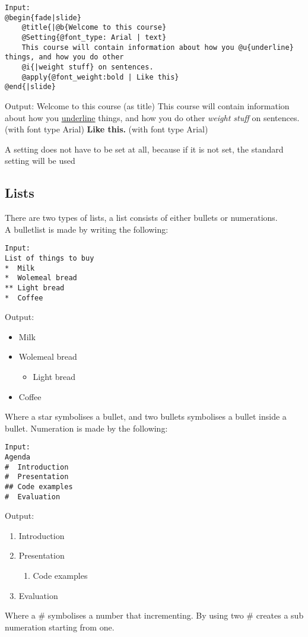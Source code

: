 \begin{verbatim}
Input:
@begin{fade|slide}
    @title{|@b{Welcome to this course}
    @Setting{@font_type: Arial | text}
    This course will contain information about how you @u{underline} things, and how you do other    
    @i{|weight stuff} on sentences.
    @apply{@font_weight:bold | Like this}
@end{|slide}
\end{verbatim}
Output:
Welcome to this course (as title)
This course will contain information about how you \underline{underline} things, and how you do other \textit{weight stuff} on sentences. (with font type Arial)
\textbf{Like this.}  (with font type Arial)

A setting does not have to be set at all, because if it is not set, the standard setting will be used

\subsection{Lists}
There are two types of lists, a list consists of either bullets or numerations. \\
A bulletlist is made by writing the following:

\begin{verbatim}
Input:
List of things to buy
*  Milk
*  Wolemeal bread
** Light bread
*  Coffee
\end{verbatim}

Output:
\begin{itemize}
\item Milk
\item Wolemeal bread

\begin{itemize}
\item Light bread
\end{itemize}

\item Coffee
\end{itemize}

Where a star symbolises a bullet, and two bullets symbolises a bullet inside a bullet.
Numeration is made by the following:

\begin{verbatim}
Input:
Agenda
#  Introduction
#  Presentation
## Code examples
#  Evaluation
\end{verbatim}

Output:
\begin{enumerate}
\item Introduction
\item Presentation
\begin{enumerate}
\item Code examples
\end{enumerate}
\item Evaluation
\end{enumerate}

Where a \# symbolises a number that incrementing. By using two \# creates a sub numeration starting from one.